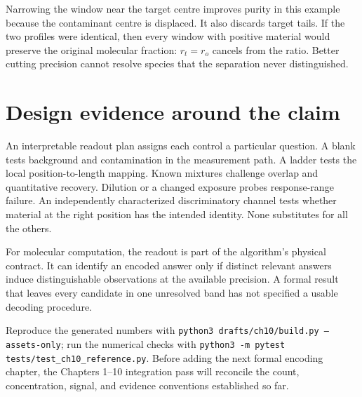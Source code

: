 Narrowing the window near the target centre improves purity in this example because the contaminant centre is displaced. It also discards target tails. If the two profiles were identical, then every window with positive material would preserve the original molecular fraction: $r_t=r_o$ cancels from the ratio. Better cutting precision cannot resolve species that the separation never distinguished.

\section{Design evidence around the claim}
An interpretable readout plan assigns each control a particular question. A blank tests background and contamination in the measurement path. A ladder tests the local position-to-length mapping. Known mixtures challenge overlap and quantitative recovery. Dilution or a changed exposure probes response-range failure. An independently characterized discriminatory channel tests whether material at the right position has the intended identity. None substitutes for all the others.

For molecular computation, the readout is part of the algorithm's physical contract. It can identify an encoded answer only if distinct relevant answers induce distinguishable observations at the available precision. A formal result that leaves every candidate in one unresolved band has not specified a usable decoding procedure.

Reproduce the generated numbers with \texttt{python3 drafts/ch10/build.py --assets-only}; run the numerical checks with \texttt{python3 -m pytest tests/test\_ch10\_reference.py}. Before adding the next formal encoding chapter, the Chapters 1--10 integration pass will reconcile the count, concentration, signal, and evidence conventions established so far.

